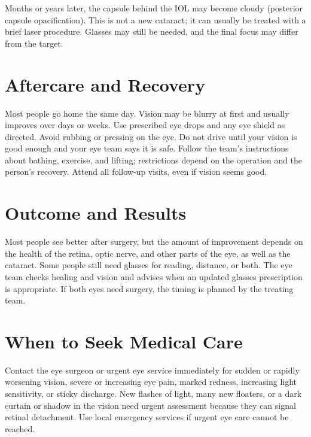 Months or years later, the capsule behind the IOL may become cloudy (posterior capsule opacification). This is not a new cataract; it can usually be treated with a brief laser procedure. Glasses may still be needed, and the final focus may differ from the target.

\section*{Aftercare and Recovery}
Most people go home the same day. Vision may be blurry at first and usually improves over days or weeks. Use prescribed eye drops and any eye shield as directed. Avoid rubbing or pressing on the eye. Do not drive until your vision is good enough and your eye team says it is safe. Follow the team's instructions about bathing, exercise, and lifting; restrictions depend on the operation and the person's recovery. Attend all follow-up visits, even if vision seems good.

\section*{Outcome and Results}
Most people see better after surgery, but the amount of improvement depends on the health of the retina, optic nerve, and other parts of the eye, as well as the cataract. Some people still need glasses for reading, distance, or both. The eye team checks healing and vision and advises when an updated glasses prescription is appropriate. If both eyes need surgery, the timing is planned by the treating team.

\section*{When to Seek Medical Care}
Contact the eye surgeon or urgent eye service immediately for sudden or rapidly worsening vision, severe or increasing eye pain, marked redness, increasing light sensitivity, or sticky discharge. New flashes of light, many new floaters, or a dark curtain or shadow in the vision need urgent assessment because they can signal retinal detachment. Use local emergency services if urgent eye care cannot be reached.


